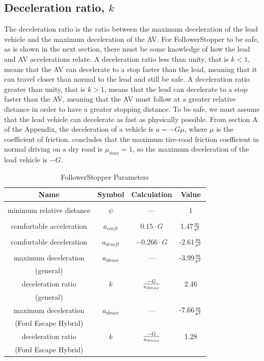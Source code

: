 \documentclass[conference]{IEEEtran}
\begin{document}
\subsection{Deceleration ratio, $k$}
The deceleration ratio is the ratio between the maximum deceleration of the lead vehicle and the maximum deceleration of the AV. For FollowerStopper to be safe, as is shown in the next section, there must be some knowledge of how the lead and AV accelerations relate. A deceleration ratio less than unity, that is $k<1$, means that the AV can decelerate to a stop faster than the lead, meaning that it can travel closer than normal to the lead and still be safe. A deceleration ratio greater than unity, that is $k>1$, means that the lead can decelerate to a stop faster than the AV, meaning that the AV must follow at a greater relative distance in order to have a greater stopping distance. To be safe, we must assume that the lead vehicle can decelerate as fast as physically possible. From section A of the Appendix, the deceleration of a vehicle is $a=-G\mu$, where $\mu$ is the coefficient of friction. \cite{road conditions} concludes that the maximum tire-road friction coefficient in normal driving on a dry road is $\mu_{max}=1$, so the maximum deceleration of the lead vehicle is $-G$.

\begin{table}[htbp]
\caption{FollowerStopper Parameters}
\begin{center}
\begin{tabular}{|c|c|c|c|}
\hline
\textbf{Name} & \textbf{Symbol} & \textbf{Calculation} & \textbf{Value} \\
\hline
					&				&						&					\\
minimum relative distance	&	$\psi$		&	---					&	1				\\
					&				&						&					\\
comfortable acceleration	&	$a_{cmft}$	&	$0.15\cdot G$			&	1.47$m\over s^2$	\\
					&				&						&					\\
comfortable deceleration	&	$a_{dcmft}$	&	$-0.266\cdot G$		&	-2.61$m\over s^2$	\\
					&				&						&					\\
maximum deceleration	&	$a_{dmax}$	&	---					&	-3.99$m\over s^2$	\\
(general)				&				&						&					\\
deceleration ratio		&	$k$			&	$-G\over a_{dmax}$		&	2.46				\\
(general)				&				&						&					\\
maximum deceleration	&	$a_{dmax}$	&	---					&	-7.66$m\over s^2$	\\
(Ford Escape Hybrid)	&				&						&					\\
deceleration ratio		&	$k$			&	$-G\over a_{dmax}$		&	1.28				\\
(Ford Escape Hybrid)	&				&						&					\\

\hline
\end{tabular}
\label{tab1}
\end{center}
\end{table}
\end{document}
